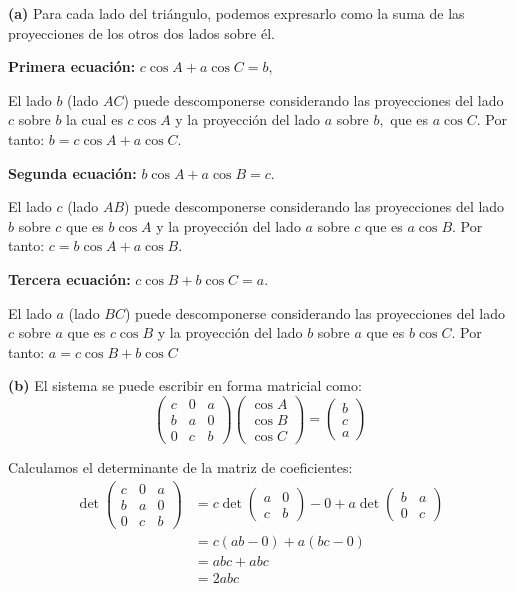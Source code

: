 \begin{prob}
\begin{myproof}
\textbf{(a)} Para cada lado del triángulo, podemos expresarlo como la suma de las proyecciones de los otros dos lados sobre él.

\textbf{Primera ecuación:} $c\cos A + a\cos C = b,$

El lado $b$ (lado $AC$) puede descomponerse considerando las proyecciones del lado $c$ sobre $b$ la cual es $c\cos A$ y la proyección del lado $a$ sobre $b,$ que es $a\cos C.$ Por tanto: $b = c\cos A + a\cos C.$

\textbf{Segunda ecuación:} $b\cos A + a\cos B = c.$

El lado $c$ (lado $AB$) puede descomponerse considerando las proyecciones del lado $b$ sobre $c$ que es $b\cos A$ y la proyección del lado $a$ sobre $c$ que es $a\cos B.$ Por tanto: $c = b\cos A + a\cos B.$

\textbf{Tercera ecuación:} $c\cos B + b\cos C = a.$

El lado $a$ (lado $BC$) puede descomponerse considerando las proyecciones del lado $c$ sobre $a$ que es $c\cos B$ y la proyección del lado $b$ sobre $a$ que es $b\cos C.$ Por tanto: $a = c\cos B + b\cos C$

\textbf{(b)}  El sistema se puede escribir en forma matricial como:
\[\begin{pmatrix}
c & 0 & a \\
b & a & 0 \\
0 & c & b
\end{pmatrix}
\begin{pmatrix}
\cos A \\
\cos B \\
\cos C
\end{pmatrix}
=
\begin{pmatrix}
b \\
c \\
a
\end{pmatrix}\]

Calculamos el determinante de la matriz de coeficientes:
\begin{align*}
\det\begin{pmatrix}
c & 0 & a \\
b & a & 0 \\
0 & c & b
\end{pmatrix} &= c \det\begin{pmatrix} a & 0 \\ c & b \end{pmatrix} - 0 + a \det\begin{pmatrix} b & a \\ 0 & c \end{pmatrix}\\
&= c(ab - 0) + a(bc - 0)\\
&= abc + abc\\
&= 2abc
\end{align*}


\end{myproof}
\end{prob}
